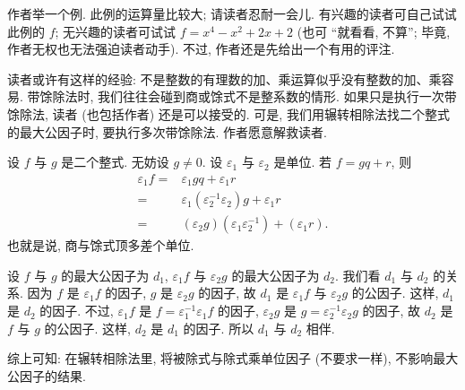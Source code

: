 作者举一个例. 此例的运算量比较大; 请读者忍耐一会{\scriptsize 儿}. 有兴趣的读者可自己试试此例的 $f$; 无兴趣的读者可试试 $f = x^4-x^2+2 x+2$ (也可 ``就看看, 不算''; 毕竟, 作者无权也无法强迫读者动手). 不过, 作者还是先给出一个有用的评注.

\begin{remark}
    读者或许有这样的经验: 不是整数的有理数的加、乘运算似乎没有整数的加、乘容易. 带馀除法时, 我们往往会碰到商或馀式不是整系数的情形. 如果只是执行一次带馀除法, 读者 (也包括作者) 还是可以接受的. 可是, 我们用辗转相除法找二个整式的最大公因子时, 要执行多次带馀除法. 作者愿意解救读者.

    设 $f$ 与 $g$ 是二个整式. 无妨设 $g \neq 0$. 设 $\varepsilon_1$ 与 $\varepsilon_2$ 是单位. 若 $f = gq + r$, 则
    \begin{align*}
        \varepsilon_1 f
        = {} & \varepsilon_1 gq + \varepsilon_1 r                                        \\
        = {} & \varepsilon_1 (\varepsilon_2^{-1} \varepsilon_2) g + \varepsilon_1 r      \\
        = {} & (\varepsilon_2 g) (\varepsilon_1 \varepsilon_2^{-1}) + (\varepsilon_1 r).
    \end{align*}
    也就是说, 商与馀式顶多差个单位.

    设 $f$ 与 $g$ 的最大公因子为 $d_1$, $\varepsilon_1 f$ 与 $\varepsilon_2 g$ 的最大公因子为 $d_2$. 我们看 $d_1$ 与 $d_2$ 的关系. 因为 $f$ 是 $\varepsilon_1 f$ 的因子, $g$ 是 $\varepsilon_2 g$ 的因子, 故 $d_1$ 是 $\varepsilon_1 f$ 与 $\varepsilon_2 g$ 的公因子. 这样, $d_1$ 是 $d_2$ 的因子. 不过, $\varepsilon_1 f$ 是 $f = \varepsilon_1^{-1} \varepsilon_1 f$ 的因子, $\varepsilon_2 g$ 是 $g = \varepsilon_2^{-1} \varepsilon_2 g$ 的因子, 故 $d_2$ 是 $f$ 与 $g$ 的公因子. 这样, $d_2$ 是 $d_1$ 的因子. 所以 $d_1$ 与 $d_2$ 相伴.

    综上可知: 在辗转相除法里, 将被除式与除式乘单位因子 (不要求一样), 不影响最大公因子的结果.
\end{remark}

